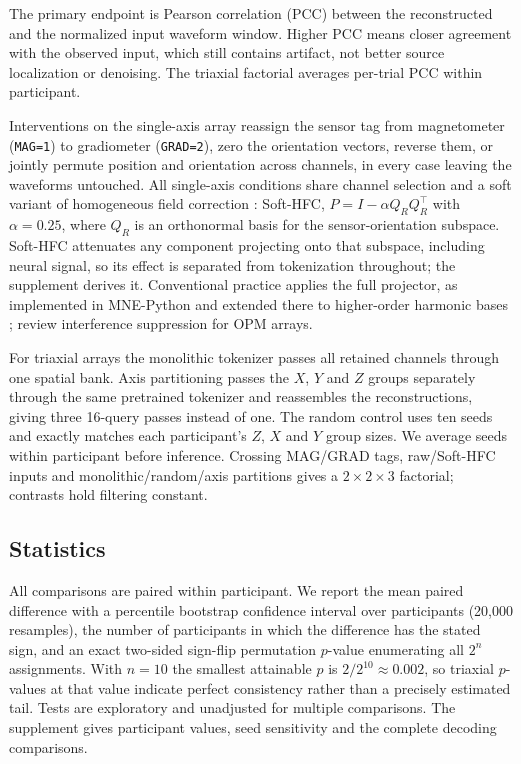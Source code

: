 \documentclass[letterpaper]{article}
\begin{document}
The primary endpoint is Pearson correlation (PCC) between the reconstructed and the normalized input waveform window. Higher PCC means closer agreement with the observed input, which still contains artifact, not better source localization or denoising. The triaxial factorial averages per-trial PCC within participant.

Interventions on the single-axis array reassign the sensor tag from magnetometer (\texttt{MAG=1}) to gradiometer (\texttt{GRAD=2}), zero the orientation vectors, reverse them, or jointly permute position and orientation across channels, in every case leaving the waveforms untouched. All single-axis conditions share channel selection and a soft variant of homogeneous field correction \citep{tierney2021hfc}: Soft-HFC, $P = I - \alpha Q_R Q_R^{\top}$ with $\alpha = 0.25$, where $Q_R$ is an orthonormal basis for the sensor-orientation subspace. Soft-HFC attenuates any component projecting onto that subspace, including neural signal, so its effect is separated from tokenization throughout; the supplement derives it. Conventional practice applies the full projector, as implemented in MNE-Python \citep{mneopmtutorial} and extended there to higher-order harmonic bases \citep{tierney2022harmonic}; \citet{seymour2022interference} review interference suppression for OPM arrays.

For triaxial arrays the monolithic tokenizer passes all retained channels through one spatial bank. Axis partitioning passes the $X$, $Y$ and $Z$ groups separately through the same pretrained tokenizer and reassembles the reconstructions, giving three 16-query passes instead of one. The random control uses ten seeds and exactly matches each participant's $Z$, $X$ and $Y$ group sizes. We average seeds within participant before inference. Crossing MAG/GRAD tags, raw/Soft-HFC inputs and monolithic/random/axis partitions gives a $2\times2\times3$ factorial; contrasts hold filtering constant.

\subsection{Statistics}
All comparisons are paired within participant. We report the mean paired difference with a percentile bootstrap confidence interval over participants (20{,}000 resamples), the number of participants in which the difference has the stated sign, and an exact two-sided sign-flip permutation $p$-value enumerating all $2^{n}$ assignments. With $n=10$ the smallest attainable $p$ is $2/2^{10} \approx 0.002$, so triaxial $p$-values at that value indicate perfect consistency rather than a precisely estimated tail. Tests are exploratory and unadjusted for multiple comparisons. The supplement gives participant values, seed sensitivity and the complete decoding comparisons.
\end{document}
